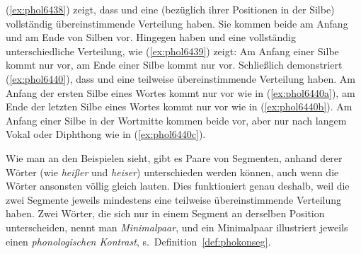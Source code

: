 \begin{exe}
  \ex\label{ex:phol6438}
    \begin{xlist}
    \end{xlist}
  \ex\label{ex:phol6440}
    \begin{xlist}
    \end{xlist}
\end{exe}

(\ref{ex:phol6438}) zeigt, dass \textipa{[t]} und \textipa{[k]} eine (bezüglich ihrer Positionen in der Silbe) vollständig übereinstimmende Verteilung haben.
Sie kommen beide am Anfang und am Ende von Silben vor.
Hingegen haben \textipa{[h]} und \textipa{[N]} eine vollständig unterschiedliche  Verteilung, wie (\ref{ex:phol6439}) zeigt:
Am Anfang einer Silbe kommt nur \textipa{[h]} vor, am Ende einer Silbe kommt nur \textipa{[N]} vor.
Schließlich demonstriert (\ref{ex:phol6440}), dass \textipa{[s]} und \textipa{[z]} eine teilweise übereinstimmende Verteilung haben.
Am Anfang der ersten Silbe eines Wortes kommt nur \textipa{[z]} vor wie in (\ref{ex:phol6440a}), am Ende der letzten Silbe eines Wortes kommt nur \textipa{[s]} vor wie in (\ref{ex:phol6440b}).
Am Anfang einer Silbe in der Wortmitte kommen beide vor, \textipa{[z]} aber nur nach langem Vokal oder Diphthong wie in (\ref{ex:phol6440c}).

Wie man an den Beispielen sieht, gibt es Paare von Segmenten, anhand derer Wörter (wie \textit{heißer} und \textit{heiser}) unterschieden werden können, auch wenn die Wörter ansonsten völlig gleich lauten.
Dies funktioniert genau deshalb, weil die zwei Segmente jeweils mindestens eine teilweise übereinstimmende Verteilung haben.
Zwei Wörter, die sich nur in einem Segment an derselben Position unterscheiden, nennt man \textit{Minimalpaar}, und ein Minimalpaar illustriert jeweils einen \textit{phonologischen Kontrast}, s.\ Definition~\ref{def:phokonseg}.



